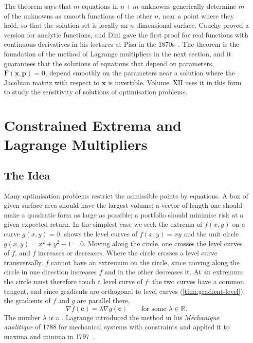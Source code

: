 The theorem says that $m$ equations in $n+m$ unknowns generically determine $m$ of the unknowns as smooth functions of the other $n$, near a point where they hold, so that the solution set is locally an $n$-dimensional surface. Cauchy proved a version for analytic functions, and Dini gave the first proof for real functions with continuous derivatives in his lectures at Pisa in the 1870s~\cite{krantz2002ift}. The theorem is the foundation of the method of Lagrange multipliers in the next section, and it guarantees that the solutions of equations that depend on parameters, $\mathbf F(\mathbf x,\mathbf p)=\mathbf0$, depend smoothly on the parameters near a solution where the Jacobian matrix with respect to $\mathbf x$ is invertible. Volume~XII uses it in this form to study the sensitivity of solutions of optimisation problems.

\section{Constrained Extrema and Lagrange Multipliers}
\label{sec:lagrange}

\subsection{The Idea}

Many optimisation problems restrict the admissible points by equations. A box of given surface area should have the largest volume; a vector of length one should make a quadratic form as large as possible; a portfolio should minimise risk at a given expected return. In the simplest case we seek the extrema of $f(x,y)$ on a curve $g(x,y)=0$.  shows the level curves of $f(x,y)=xy$ and the unit circle $g(x,y)=x^2+y^2-1=0$. Moving along the circle, one crosses the level curves of $f$, and $f$ increases or decreases. Where the circle crosses a level curve transversally, $f$ cannot have an extremum on the circle, since moving along the circle in one direction increases $f$ and in the other decreases it. At an extremum the circle must therefore touch a level curve of $f$: the two curves have a common tangent, and since gradients are orthogonal to level curves (\cref{thm:gradient-level}), the gradients of $f$ and $g$ are parallel there,
\[
\nabla f(\mathbf c)=\lambda\nabla g(\mathbf c)\qquad\text{for some }\lambda\in\mathbb R .
\]
The number $\lambda$ is a . Lagrange introduced the method in his \emph{M\'echanique analitique} of 1788 for mechanical systems with constraints and applied it to maxima and minima in 1797~\cite{lagrange1788}\cite[pp.~190--198]{lagrange1797}.

